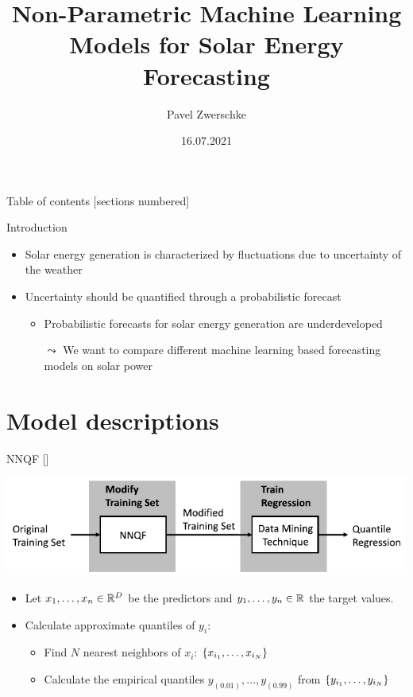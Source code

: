 \documentclass[10pt,aspectratio=169]{beamer}
\title{Non-Parametric Machine Learning Models for Solar Energy Forecasting}
\date{16.07.2021}
\author{Pavel Zwerschke}
\institute{Karlsruhe Institute of Technology}
\begin{document}
\maketitle

\begin{frame}{Table of contents}
    [sections numbered]
    \tableofcontents%
\end{frame}

\begin{frame}{Introduction}
    \begin{itemize}
        \item Solar energy generation is characterized by fluctuations due to uncertainty of the weather
        \item Uncertainty should be quantified through a probabilistic forecast
        \begin{itemize}
            \item Probabilistic forecasts for solar energy generation are underdeveloped
            \item[\(\leadsto\)] We want to compare different machine learning based forecasting models on solar power
        \end{itemize}
    \end{itemize}
\end{frame}

\section{Model descriptions}

\begin{frame}{NNQF [\cite{Ordiano2020}]}
    \begin{center}
        \includegraphics{plots/nnqf_approach.pdf}
    \end{center}
    \begin{itemize}
        \item Let \(x_1, \ldots, x_n \in \mathbb{R}^D\) be the predictors and \(y_1, \ldots, y_n\in \mathbb{R}\) the target values.
        \item Calculate approximate quantiles of \(y_i\):
        \begin{itemize}
            \item Find \(N\) nearest neighbors of \(x_i\): \(\{x_{i_1}, \ldots, x_{i_N}\}\)
            \item Calculate the empirical quantiles \(y_{(0.01)}, \ldots, y_{(0.99)}\) from \(\{y_{i_1}, \ldots, y_{i_N}\}\)
        \end{itemize}
    \end{itemize}
\end{frame}
\end{document}
